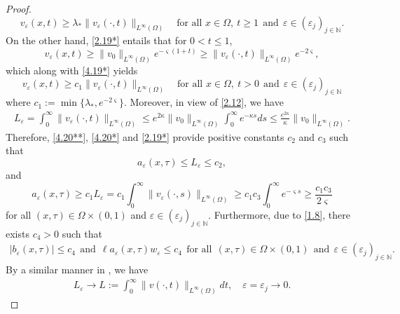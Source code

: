 \documentclass[12pt]{article}
\theoremstyle{plain}
\theoremstyle{definition}
\numberwithin{equation}{section}
\begin{document}
\begin{proof}
\begin{equation}
v_{\varepsilon}(x,t)\geq \lambda_* \|v_{\varepsilon}(\cdot,t)\|_{L^{\infty}(\Omega)}\quad\text{for all }x\in\Omega,\ t\geq 1~~\text{and}~~\varepsilon \in (\varepsilon_{j})_{j \in \mathbb{N}}.
\end{equation}
On the other hand, \eqref{2.19*} entails that  for $0<t\leq 1$,
\begin{equation*}
v_\varepsilon(x,t)\geq\|v_0\|_{L^\infty(\Omega)}e^{-\varsigma(1+t)}
\geq  \|v_{\varepsilon}(\cdot,t)\|_{L^{\infty}(\Omega)} e^{-2\varsigma},
\end{equation*}
which along with \eqref{4.19*}  yields
\begin{equation}\label{4.20**}
v_{\varepsilon}(x,t)\geq c_1\|v_{\varepsilon}(\cdot,t)\|_{L^{\infty}(\Omega)}\quad\text{for all }x\in\Omega,\ t> 0~~\text{and}~~\varepsilon \in (\varepsilon_{j})_{j \in \mathbb{N}}
\end{equation}
where $c_1:=\min\{\lambda_*, e^{-2\varsigma}\}$.
Moreover, in view of \eqref{2.12}, we have
\begin{align}\label{4.20*}
L_\varepsilon=\int_{0}^{\infty} \|v_{\varepsilon}(\cdot,t)\|_{L^{\infty}(\Omega)}\leq e^{2\kappa}\|v_0\|_{L^{\infty}(\Omega)} \int_0^{\infty}e^{-\kappa s}ds\leq\frac{e^{2\kappa}}{\kappa}\|v_0\|_{L^{\infty}(\Omega)}.
\end{align}
Therefore, \eqref{4.20**}, \eqref{4.20*} and \eqref{2.19*} provide positive constants $c_2$ and $c_3$ such that
\begin{equation}
a_{\varepsilon}(x,\tau)\leq L_\varepsilon\leq c_2,
\end{equation}
and
\begin{equation}
a_{\varepsilon}(x,\tau)\geq c_1L_\varepsilon=
c_1\int_0^{\infty}\|v_\varepsilon(\cdot,s)\|_{L^{\infty}(\Omega)}\geq c_1c_3\int_0^{\infty} e^{-\varsigma s}\geq\frac{c_1c_3}{2\varsigma}
\end{equation}
for all $(x,\tau)\in \Omega \times (0,1)$ and $\varepsilon \in (\varepsilon_{j})_{j \in \mathbb{N}}$.
Furthermore, due to \eqref{1.8}, there exists $c_4> 0$ such that
\begin{align}\label{4.2*}
   |b_{\varepsilon}(x, \tau)| \leq c_4~~\mbox{and}~~\ell a_\varepsilon(x,\tau)w_\varepsilon\leq c_4~~\text{for all}~~(x,\tau) \in \Omega \times (0,1)~~ \text{and}~~\varepsilon \in (\varepsilon_{j})_{j \in \mathbb{N}}.
\end{align}
By a similar manner in \cite{Li Winkler, Winkler3, Winkler5}, we have
\begin{align}\label{4.3*}
    L_{\varepsilon} \to L:=\int_{0}^{\infty} \|v(\cdot, t)\|_{L^{\infty}(\Omega)} dt, \quad \varepsilon= \varepsilon_{j}\to0.

\end{align}
\end{proof}
\end{document}
